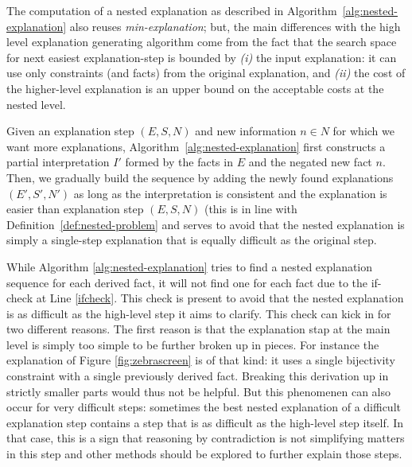 The computation of a nested explanation as described in Algorithm~\ref{alg:nested-explanation} also reuses \textit{min-explanation}; but, the main differences with the high level explanation generating algorithm come from the fact that the search space for next easiest explanation-step is bounded by \emph{(i)} the input explanation: it can use only constraints (and facts) from the original explanation, and \emph{(ii)} the cost of the higher-level explanation is an upper bound on the acceptable costs at the nested level. 

Given an explanation step $(E, S, N)$ and new information $n \in N$ for which we want more explanations, Algorithm~\ref{alg:nested-explanation} first constructs a partial interpretation $I'$ formed by the facts in $E$ and the negated new fact $n$. 
Then, we gradually build the sequence by adding the newly found explanations $(E', S', N')$ as long as the interpretation is consistent and the explanation is easier than explanation step $(E, S, N)$ (this is in line with Definition~\ref{def:nested-problem} and serves to avoid that the nested explanation is simply a single-step explanation that is equally difficult as the original step.  

While Algorithm \ref{alg:nested-explanation} tries to find a nested explanation sequence for each derived fact, it will not find one for each fact due to the if-check at Line \ref{ifcheck}. This check is present to avoid that the nested explanation is as difficult as the high-level step it aims to clarify. This check can kick in for two different reasons. The first reason is that the explanation stap at the main level is simply too simple to be further broken up in pieces. For instance the explanation of Figure \ref{fig:zebrascreen} is of that kind: it uses a single bijectivity constraint with a single previously derived fact. Breaking this derivation up in strictly smaller parts would thus not be helpful. But this phenomenen can also occur for very difficult steps: sometimes the best nested explanation of a difficult explanation step contains a step that is as difficult as the high-level step itself. In that case, this is a sign that reasoning by contradiction is not simplifying matters in this step and other methods should be explored to further explain those steps. 

